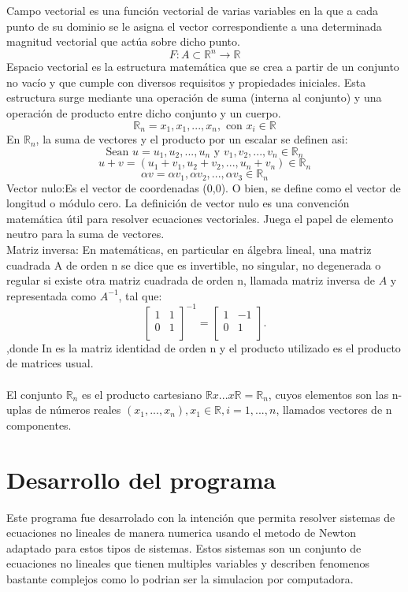 \documentclass[11pt]{article}
\begin{document}
Campo vectorial es una función vectorial de varias variables en la que a cada punto de su dominio se le asigna el vector correspondiente a una determinada magnitud vectorial que actúa sobre dicho punto.$$F:A\subset\mathbb{R}^n \longrightarrow \mathbb{R}$$ 
Espacio vectorial es la estructura matemática que se crea a partir de un conjunto no vacío y que cumple con diversos requisitos y propiedades iniciales. Esta estructura surge mediante una operación de suma (interna al conjunto) y una operación de producto entre dicho conjunto y un cuerpo.
$$\mathbb{R}_n={x_1,x_1,...,x_n},\textrm{ con } x_i\in \mathbb{R}$$
En $\mathbb{R}_n$, la suma de vectores y el producto por un escalar se definen asi:
$$\textrm{Sean } u=u_1,u_2,...,u_n \textrm{ y }  v_1,v_2,...,v_n \in \mathbb{R}_n$$
$$u+v=(u_1+v_1,u_2+v_2,...,u_n+v_n)\in \mathbb{R}_n$$
$$\alpha v=\alpha v_1,\alpha v_2,...,\alpha v_3 \in \mathbb{R}_n$$
Vector nulo:Es el vector de coordenadas (0,0). O bien, se define como el vector de longitud o módulo cero. La definición de vector nulo es una convención matemática útil para resolver ecuaciones vectoriales. Juega el papel de elemento neutro para la suma de vectores.\\

Matriz inversa: En matemáticas, en particular en álgebra lineal, una matriz cuadrada A de orden n se dice que es invertible, no singular, no degenerada o regular si existe otra matriz cuadrada de orden n, llamada matriz inversa de $A$ y representada como $A^{-1}$, tal que:
$$\begin{bmatrix} 1 & 1 \\ 0 & 1 \\ \end{bmatrix}^{-1} = \begin{bmatrix} 1 & -1 \\ 0 & 1 \\ \end{bmatrix}.$$
 ,donde In es la matriz identidad de orden n y el producto utilizado es el producto de matrices usual.\\
 \\El conjunto $\mathbb{R}_n$ es el producto cartesiano $\mathbb{R}x...x\mathbb{R}=\mathbb{R}_n$, cuyos elementos son las n-uplas de números reales $(x_1,...,x_n), x_1 \in \mathbb{R},i=1,...,n$, llamados vectores de n componentes.
\section{Desarrollo del programa}
Este programa fue desarrolado con la intención que permita resolver sistemas de ecuaciones no lineales de manera numerica usando el metodo de Newton adaptado para estos tipos de sistemas. Estos sistemas son un conjunto de ecuaciones no lineales que tienen multiples variables y describen fenomenos bastante complejos como lo podrian ser la simulacion por computadora. 
\end{document}
